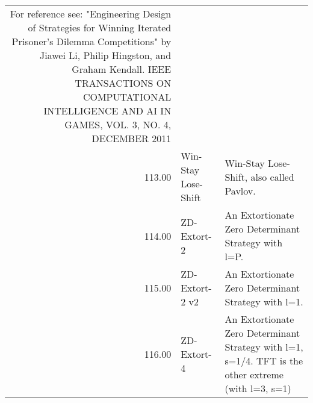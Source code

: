 \begin{tabular}{rll}
	For reference see: "Engineering Design of Strategies for Winning
	Iterated Prisoner's Dilemma Competitions" by Jiawei Li, Philip Hingston,
	and Graham Kendall.  IEEE TRANSACTIONS ON COMPUTATIONAL INTELLIGENCE AND AI
	IN GAMES, VOL. 3, NO. 4, DECEMBER 2011                                                                                                                                                                                                                                                                                                                                                                                                                                                                                                                                                                                                                                                                                           \\
	113.00 & Win-Stay Lose-Shift         & Win-Stay Lose-Shift, also called Pavlov.                                                                                          \\
	114.00 & ZD-Extort-2                 & An Extortionate Zero Determinant Strategy with l=P.                                                                               \\
	115.00 & ZD-Extort-2 v2              & An Extortionate Zero Determinant Strategy with l=1.                                                                               \\
	116.00 & ZD-Extort-4                 & An Extortionate Zero Determinant Strategy with l=1, s=1/4. TFT is the
	other extreme (with l=3, s=1)                                                                                                                                                                                                                                                                                                                                                                                                                                                                                                                                                                                                                                                                                                                                                                                                                                                                                                                  \\

\end{tabular}
